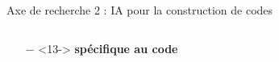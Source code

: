 \documentclass[t,compress,mathserif,12pt,xcolor=dvipsnames]{beamer}
\newcommand{\RED} [1]{\textcolor{Paired-5}{\textbf{#1}}}
\begin{document}
\begin{frame}[t]{Axe de recherche 2 : IA pour la construction de codes}
\begin{minipage}[t][5.0cm][t]{\textwidth}
\begin{columns}[T]
\begin{column}{0.45\textwidth}
{\begin{itemize}
          \item[\RED{$-$}]  <13-> \RED  {spécifique au code}
        \end{itemize}
        }
      \end{column}
      \begin{column}{0.04\textwidth}
      \end{column}
      \begin{column}{0.45\textwidth}
        \vspace*{-1.1cm}
        \begin{center}

\end{center}
\end{column}
\end{columns}
\end{minipage}
\end{frame}
\end{document}
